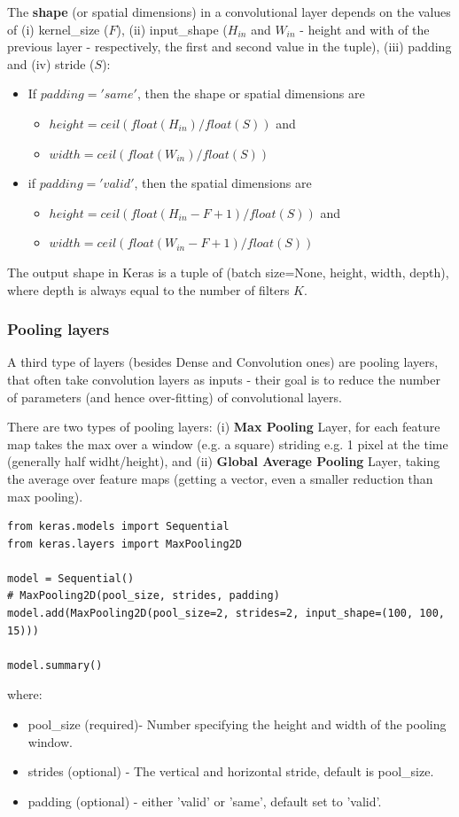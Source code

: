 \documentclass[11pt]{article}
\begin{document}
The \textbf{shape} (or spatial dimensions) in a convolutional layer depends on the values of (i) kernel\_size ($F$), (ii) input\_shape ($H_{in}$ and $W_{in}$ - height and with of the previous layer - respectively, the first and second value in the tuple), (iii) padding and (iv) stride ($S$):
\begin{itemize}
	\item If $padding = 'same'$, then the shape or spatial dimensions are 
	\begin{itemize}
		\item $height = ceil(float(H_{in}) / float(S))$ and
		\item $width = ceil(float(W_{in}) / float(S))$
	\end{itemize}
	\item if $padding = 'valid'$, then the spatial dimensions are
	\begin{itemize}
		\item $height = ceil(float(H_{in} - F + 1) / float(S))$  and
		\item $width = ceil(float(W_{in} - F + 1) / float(S))$
	\end{itemize}	
\end{itemize}
The output shape in Keras is a tuple of (batch size=None, height, width, depth), where depth is always equal to the number of filters $K$.

\subsubsection{Pooling layers}
A third type of layers (besides Dense and Convolution ones) are pooling layers, that often take convolution layers as inputs - their goal is to reduce the number of parameters (and hence over-fitting) of convolutional layers.

There are two types of pooling layers: (i) \textbf{Max Pooling} Layer, for each feature map takes the max over a window (e.g. a square) striding e.g. 1 pixel at the time (generally half widht/height),  and (ii) \textbf{Global Average Pooling} Layer, taking the average over feature maps (getting a vector, even a smaller reduction  than max pooling). 

\begin{lstlisting}
from keras.models import Sequential
from keras.layers import MaxPooling2D

model = Sequential()
# MaxPooling2D(pool_size, strides, padding)
model.add(MaxPooling2D(pool_size=2, strides=2, input_shape=(100, 100, 15)))

model.summary()
\end{lstlisting}
where:
\begin{itemize}
	\item pool\_size (required)- Number specifying the height and width of the pooling window.
	\item strides (optional) - The vertical and horizontal stride, default is pool\_size.
	\item padding (optional) - either 'valid' or 'same', default set to 'valid'.
\end{itemize}
\end{document}
